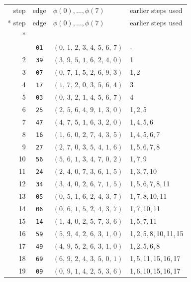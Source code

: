 \begin{longtable}{r c p{} p{}}
\toprule
step & edge & $\phi(0),\ldots,\phi(7)$ & earlier steps used \\*
\midrule
\endfirsthead
\toprule
step & edge & $\phi(0),\ldots,\phi(7)$ & earlier steps used \\*
\midrule
\endhead
\midrule
\multicolumn{4}{r}{\emph{continued on next page}}\\
\endfoot
\bottomrule
\endlastfoot
1 & \texttt{01} & $(0,\,1,\,2,\,3,\,4,\,5,\,6,\,7)$ & - \\
2 & \texttt{39} & $(3,\,9,\,5,\,1,\,6,\,2,\,4,\,0)$ & 1 \\
3 & \texttt{07} & $(0,\,7,\,1,\,5,\,2,\,6,\,9,\,3)$ & 1,\,2 \\
4 & \texttt{17} & $(1,\,7,\,2,\,0,\,3,\,5,\,6,\,4)$ & 3 \\
5 & \texttt{03} & $(0,\,3,\,2,\,1,\,4,\,5,\,6,\,7)$ & 4 \\
6 & \texttt{25} & $(2,\,5,\,6,\,4,\,9,\,1,\,3,\,0)$ & 1,\,2,\,5 \\
7 & \texttt{47} & $(4,\,7,\,5,\,1,\,6,\,3,\,2,\,0)$ & 1,\,4,\,5,\,6 \\
8 & \texttt{16} & $(1,\,6,\,0,\,2,\,7,\,4,\,3,\,5)$ & 1,\,4,\,5,\,6,\,7 \\
9 & \texttt{27} & $(2,\,7,\,0,\,3,\,5,\,4,\,1,\,6)$ & 1,\,5,\,6,\,7,\,8 \\
10 & \texttt{56} & $(5,\,6,\,1,\,3,\,4,\,7,\,0,\,2)$ & 1,\,7,\,9 \\
11 & \texttt{24} & $(2,\,4,\,0,\,7,\,3,\,6,\,1,\,5)$ & 1,\,3,\,7,\,10 \\
12 & \texttt{34} & $(3,\,4,\,0,\,2,\,6,\,7,\,1,\,5)$ & 1,\,5,\,6,\,7,\,8,\,11 \\
13 & \texttt{05} & $(0,\,5,\,1,\,6,\,2,\,4,\,3,\,7)$ & 1,\,7,\,8,\,10,\,11 \\
14 & \texttt{06} & $(0,\,6,\,1,\,5,\,2,\,4,\,3,\,7)$ & 1,\,7,\,10,\,11 \\
15 & \texttt{14} & $(1,\,4,\,0,\,2,\,5,\,7,\,3,\,6)$ & 1,\,5,\,7,\,11 \\
16 & \texttt{59} & $(5,\,9,\,4,\,2,\,6,\,3,\,1,\,0)$ & 1,\,2,\,5,\,8,\,10,\,11,\,15 \\
17 & \texttt{49} & $(4,\,9,\,5,\,2,\,6,\,3,\,1,\,0)$ & 1,\,2,\,5,\,6,\,8 \\
18 & \texttt{69} & $(6,\,9,\,2,\,4,\,3,\,5,\,0,\,1)$ & 1,\,5,\,11,\,15,\,16,\,17 \\
19 & \texttt{09} & $(0,\,9,\,1,\,4,\,2,\,5,\,3,\,6)$ & 1,\,6,\,10,\,15,\,16,\,17 \\

\end{longtable}
